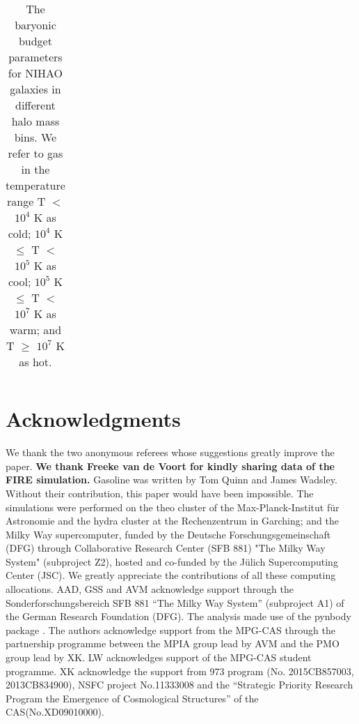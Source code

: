 \documentclass[useAMS,usenatbib]{mn2e}
\begin{document}
\begin{table*}
  \caption{The baryonic budget parameters for NIHAO galaxies
    in different halo  mass bins. We refer to gas in the temperature range  T
  $<$ $10^4$ K as cold; $10^4$ K $\leqslant$ T $<$ $10^5$ K as cool;
  $10^5$ K $\leqslant$ T $<$ $10^7$ K as warm;  and T $\geqslant$
  $10^7$ K as hot.}
\begin{center}
\begin{tabular}{ccccc}
\hline

\hline
\end{tabular}
\label{tab:comparison}
\end{center}
\end{table*}





\section*{Acknowledgments} 

We thank the two anonymous referees whose suggestions greatly  improve
the paper.  {\bf We thank Freeke van de Voort for kindly sharing data
  of the FIRE simulation.}  {\sc Gasoline} was written by Tom Quinn
and James Wadsley. Without their contribution, this paper would have
been impossible.
%
The simulations were performed on the {\sc theo} cluster of the
Max-Planck-Institut f\"ur Astronomie and the {\sc hydra} cluster at
the Rechenzentrum in Garching; and the Milky Way supercomputer, funded
by the Deutsche Forschungsgemeinschaft (DFG) through Collaborative
Research Center (SFB 881) "The Milky Way System" (subproject Z2),
hosted and co-funded by the J\"ulich Supercomputing Center (JSC). We
greatly appreciate the contributions of all these computing
allocations.
%
AAD, GSS and AVM acknowledge support through the
Sonderforschungsbereich SFB 881 “The Milky Way System” (subproject A1)
of the German Research Foundation (DFG).  The analysis made use of the
pynbody package \citep{Pontzen13}.
%
The authors acknowledge support from the MPG-CAS through the
partnership programme between the MPIA group lead by AVM and the PMO
group lead by XK.
%
LW acknowledges support of the MPG-CAS student programme.
%
XK acknowledge the support from 973 program (No. 2015CB857003,
2013CB834900), NSFC project No.11333008 and the ``Strategic Priority
Research Program the Emergence of Cosmological Structures'' of the
CAS(No.XD09010000).


\end{document}
